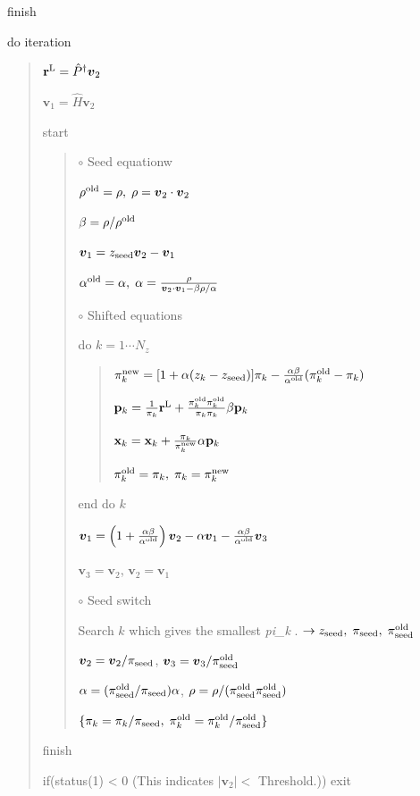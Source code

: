 \documentclass[letterpaper,10pt,dvipdfmx,openany]{sphinxmanual}
\begin{document}
 finish

do iteration
\begin{quote}

\({\bf r}^{\rm L} = {\hat P}^\dagger {\boldsymbol v}_2\)

\({\boldsymbol v}_1 = {\hat H} {\boldsymbol v}_2\)

 start
\begin{quote}

\(\circ\) Seed equationw

\(\rho^{\rm old} = \rho,\; \rho = {\boldsymbol v}_2 \cdot {\boldsymbol v}_2\)

\(\beta = \rho / \rho^{\rm old}\)

\({\boldsymbol v}_1 = z_{\rm seed} {\boldsymbol v}_2 - {\boldsymbol v}_1\)

\(\alpha^{\rm old} = \alpha,\; \alpha = \frac{\rho}{{\boldsymbol v}_2 \cdot {\boldsymbol v}_1 - \beta \rho / \alpha }\)

\(\circ\) Shifted equations

do \(k = 1 \cdots N_z\)
\begin{quote}

\(\pi_k^{\rm new} = [1+\alpha(z_k-z_{\rm seed})]\pi_k - \frac{\alpha \beta}{\alpha^{\rm old}}(\pi_k^{\rm old} - \pi_k)\)

\({\bf p}_{k} = \frac{1}{\pi_k} {\bf r}^{\rm L} + \frac{\pi^{\rm old}_k \pi^{\rm old}_k}{\pi_k \pi_k} \beta {\bf p}_{k}\)

\({\bf x}_{k} = {\bf x}_{k} + \frac{\pi_k}{\pi_k^{\rm new}} \alpha {\bf p}_{k}\)

\(\pi_k^{\rm old} = \pi_k,\; \pi_k = \pi_k^{\rm new}\)
\end{quote}

end do \(k\)

\({\boldsymbol v}_1 = \left( 1 + \frac{\alpha \beta}{\alpha^{\rm old}} \right) {\boldsymbol v}_2 - \alpha {\boldsymbol v}_1 - \frac{\alpha \beta}{\alpha^{\rm old}} {\boldsymbol v}_3\)

\({\boldsymbol v}_3 = {\boldsymbol v}_2\),
\({\boldsymbol v}_2 = {\boldsymbol v}_1\)

\(\circ\) Seed switch

Search \(k\) which gives the smallest \emph{\textbar{}pi\_k\textbar{}} .
\(\rightarrow z_{\rm seed},\; \pi_{\rm seed},\; \pi_{\rm seed}^{\rm old}\)

\({\boldsymbol v}_2 = {\boldsymbol v}_2 / \pi_{\rm seed}\),
\({\boldsymbol v}_3 = {\boldsymbol v}_3 / \pi_{\rm seed}^{\rm old}\)

\(\alpha = (\pi_{\rm seed}^{\rm old} / \pi_{\rm seed}) \alpha\),
\(\rho = \rho / (\pi_{\rm seed}^{\rm old} \pi_{\rm seed}^{\rm old})\)

\(\{\pi_k = \pi_k / \pi_{\rm seed},\; \pi_k^{\rm old} = \pi_k^{\rm old} / \pi_{\rm seed}^{\rm old}\}\)
\end{quote}

 finish

if(status(1) \textless{} 0 (This indicates \(|{\boldsymbol v}_2| <\) Threshold.)) exit
\end{quote}
\end{document}
